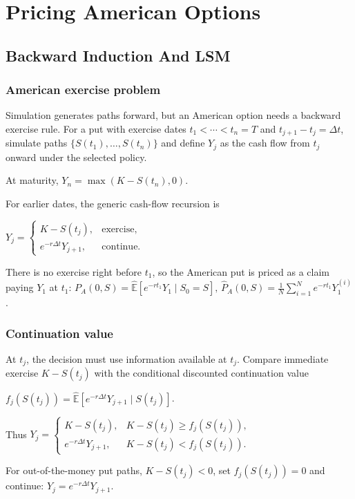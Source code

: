 \section{Pricing American Options}

\subsection{Backward Induction And LSM}

\subsubsection*{American exercise problem}

Simulation generates paths forward, but an American option needs a backward exercise rule. For a put with exercise dates $t_1<\cdots<t_n=T$ and $t_{j+1}-t_j=\Delta t$, simulate paths $\{S(t_1),\ldots,S(t_n)\}$ and define $Y_j$ as the cash flow from $t_j$ onward under the selected policy.

At maturity,
$Y_n=\max(K-S(t_n),0)$.

For earlier dates, the generic cash-flow recursion is

$Y_j=\begin{cases}K-S(t_j),&\text{exercise},\\ e^{-r\Delta t}Y_{j+1},&\text{continue}.\end{cases}$

There is no exercise right before $t_1$, so the American put is priced as a claim paying $Y_1$ at $t_1$:
$P_A(0,S)=\hat{\mathbb{E}}\left[e^{-rt_1}Y_1\mid S_0=S\right],\, \hat P_A(0,S)=\frac1N\sum_{i=1}^Ne^{-rt_1}Y_1^{(i)}$.

\subsubsection*{Continuation value}

At $t_j$, the decision must use information available at $t_j$. Compare immediate exercise $K-S(t_j)$ with the conditional discounted continuation value

$f_j(S(t_j))=\hat{\mathbb{E}}\left[e^{-r\Delta t}Y_{j+1}\mid S(t_j)\right]$.

Thus
$Y_j=\begin{cases}K-S(t_j),&K-S(t_j)\ge f_j(S(t_j)),\\ e^{-r\Delta t}Y_{j+1},&K-S(t_j)<f_j(S(t_j)).\end{cases}$

For out-of-the-money put paths, $K-S(t_j)<0$, set $f_j(S(t_j))=0$ and continue: $Y_j=e^{-r\Delta t}Y_{j+1}$.


